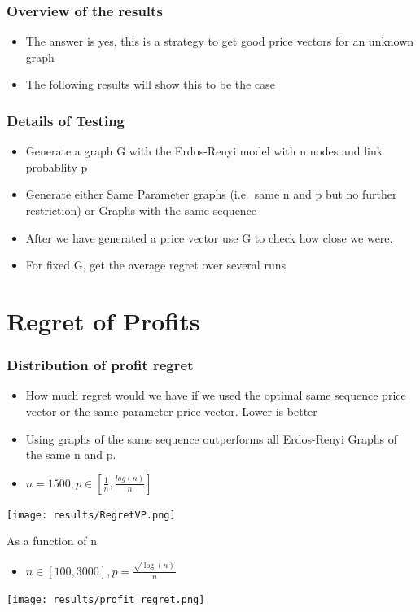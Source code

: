 \documentclass[a4paper,12pt]{beamer}
\begin{document}
\begin{frame}
  \frametitle{Overview of the results}
  \begin{itemize}
    \item The answer is yes, this is a strategy to get good price vectors for an unknown graph \\
    \item The following results will show this to be the case
  \end{itemize}
\end{frame}

\begin{frame}
  \frametitle{Details of Testing}
  \begin{itemize}
    \item Generate a graph G with the Erdos-Renyi model with n nodes and link probablity p
    \item Generate either Same Parameter graphs (i.e.\ same n and p but no further restriction) or Graphs with the same sequence
    \item After we have generated a price vector use G to check how close we were.
    \item For fixed G, get the average regret over several runs
  \end{itemize}
\end{frame}

\section{Regret of Profits}
\begin{frame}
  \frametitle{Distribution of profit regret}
  \begin{itemize}
    \item How much regret would we have if we used the optimal same sequence price vector or the same parameter price vector. Lower is better
        \item Using graphs of the same sequence outperforms all Erdos-Renyi Graphs of the same n and p.
    \item $n=1500, p \in [\frac{1}{n}, \frac{log(n)}{n}]$
  \end{itemize}
  \texttt{[image: results/RegretVP.png]}
\end{frame}

\begin{frame}{As a function of n}
  \begin{itemize}
    \item $n \in [100, 3000], p = \frac{\sqrt{\log(n)}}{n}$
  \end{itemize}
  \texttt{[image: results/profit\_regret.png]}
\end{frame}
\end{document}
